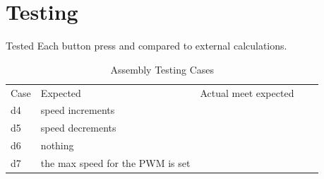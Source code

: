 \documentclass[12pt,letterpaper]{article}
\begin{document}
	

\section{Testing}
Tested Each button press and compared to external calculations.
\begin{table}[h]
	\centering
	\begin{tabular}{|l|l|l|ll}
		\cline{1-3}
		Case & Expected & Actual meet expected &  &  \\ \cline{1-3}
	d4	&speed increments&	\checkmark  &  \\ \cline{1-3}
	d5	&speed decrements&	\checkmark	&  \\ \cline{1-3}
	d6	&nothing&	\checkmark  &  \\ \cline{1-3}
	d7	&the max speed for the PWM is set&	\checkmark	&  \\ \cline{1-3}
	
	\end{tabular}
\caption{Assembly Testing Cases}
\end{table}
\end{document}
